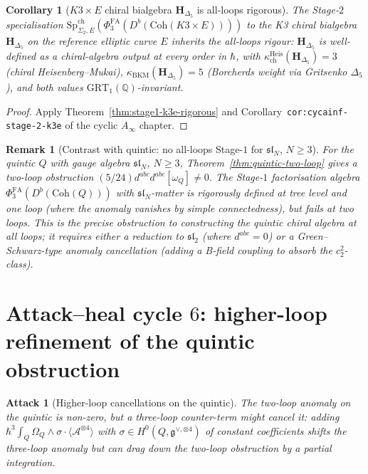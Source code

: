 \documentclass[11pt]{article}
\newtheorem{corollary}[theorem]{Corollary}
\newtheorem{remark}[theorem]{Remark}
\newtheorem{attack}[theorem]{Attack}
\providecommand{\Coh}{\mathrm{Coh}}
\providecommand{\Om}{\Omega}
\providecommand{\cA}{\mathcal{A}}
\providecommand{\fg}{\mathfrak{g}}
\providecommand{\QQ}{\mathbb{Q}}
\providecommand{\kBKM}{\kappa_{\mathrm{BKM}}}
\providecommand{\kch}{\kappa_{\mathrm{ch}}}
\providecommand{\Sp}{\mathrm{Sp}}
\providecommand{\PhiFA}{\Phi^{\mathrm{FA}}}
\providecommand{\GRT}{\mathrm{GRT}}
\begin{document}
\begin{corollary}[$K3\times E$ chiral bialgebra $\mathbf H_{\Delta_5}$
is all-loops rigorous]
\label{cor:k3e-chiral-bialgebra-rigorous}
\ClaimStatusTheorem
The Stage-$2$ specialisation
$\Sp^{\mathrm{ch}}_{\Sigma_2, E}(\PhiFA_3(D^b(\Coh(K3\times E))))$
to the K3 chiral bialgebra $\mathbf H_{\Delta_5}$ on the reference
elliptic curve $E$ inherits the all-loops rigour: $\mathbf
H_{\Delta_5}$ is well-defined as a chiral-algebra output at every
order in $\hbar$, with $\kch^{\mathrm{Heis}}(\mathbf H_{\Delta_5}) = 3$
(chiral Heisenberg--Mukai), $\kBKM(\mathbf H_{\Delta_5}) = 5$
(Borcherds weight via Gritsenko $\Delta_5$), and both values
$\GRT_1(\QQ)$-invariant.
\end{corollary}

\begin{proof}
Apply Theorem~\ref{thm:stage1-k3e-rigorous} and
Corollary~\texttt{cor:cycainf-stage-2-k3e} of the cyclic $A_\infty$
chapter.
\end{proof}

\begin{remark}[Contrast with quintic: no all-loops Stage-$1$ for
$\mathfrak{sl}_N$, $N \geq 3$]
\label{rem:quintic-no-all-loops}
For the quintic $Q$ with gauge algebra $\mathfrak{sl}_N$, $N \geq 3$,
Theorem~\ref{thm:quintic-two-loop} gives a two-loop obstruction
$(5/24) d^{abc}d^{abc} [\omega_Q] \neq 0$.  The Stage-$1$
factorisation algebra $\PhiFA_3(D^b(\Coh(Q)))$ with
$\mathfrak{sl}_N$-matter is rigorously defined at tree level and
one loop (where the anomaly vanishes by simple connectedness),
but fails at two loops.  This is the precise obstruction to
constructing the quintic chiral algebra at all loops; it
requires either a reduction to $\mathfrak{sl}_2$ (where
$d^{abc} = 0$) or a Green--Schwarz-type anomaly cancellation
(adding a B-field coupling to absorb the $c_2^2$-class).
\end{remark}

\section{Attack--heal cycle $6$:  higher-loop refinement of the
quintic obstruction}
\label{sec:cycle-6-higher-loop-quintic}

\begin{attack}[Higher-loop cancellations on the quintic]
\label{att:higher-loop-cancel}
The two-loop anomaly on the quintic is non-zero, but a three-loop
counter-term might cancel it: adding $\hbar^3 \int_Q \Om_Q \wedge
\sigma \cdot \langle \cA^{\otimes 4}\rangle$ with
$\sigma \in H^0(Q, \fg^{\vee,\otimes 4})$ of constant coefficients
shifts the three-loop anomaly but can drag down the two-loop
obstruction by a partial integration.
\end{attack}
\end{document}

